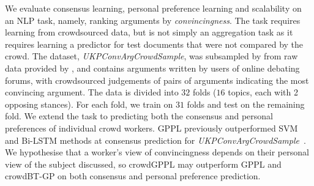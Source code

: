 We evaluate consensus learning, personal preference learning and scalability
on an NLP task, namely, ranking arguments by \emph{convincingness}. 
The task requires learning from crowdsourced data, but is not simply an aggregation task as it 
requires learning a predictor for test documents that were not compared by the crowd.
The dataset, \emph{UKPConvArgCrowdSample}, was subsampled by \citet{simpson2018finding}
from raw data provided by \citet{habernal2016argument}, and
contains arguments written by users
of online debating forums,
with crowdsourced judgements of pairs of arguments
 indicating the most convincing argument.
The data is divided into $32$ folds ($16$ topics, each with 2 opposing stances). For each fold, we train on $31$ folds and test on the remaining fold.
We extend
the task 
to predicting both the consensus and personal preferences of individual crowd workers.
GPPL previously outperformed SVM and Bi-LSTM methods at consensus prediction for \emph{UKPConvArgCrowdSample}~\citep{simpson2018finding}. 
We hypothesise that a worker's view of convincingness 
depends on their personal view of the subject 
discussed, so crowdGPPL may outperform GPPL and
 crowdBT-GP on both consensus and personal preference prediction.

